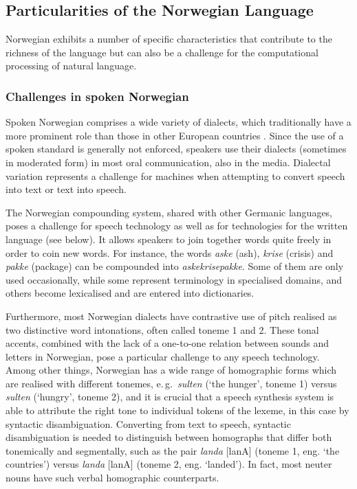 \begin{multicols}{2}
\subsection{Particularities of the Norwegian Language}

Norwegian exhibits a number of specific characteristics that contribute to the richness of the language but can also be a challenge for the computational processing of natural language. 

\subsubsection{Challenges in spoken Norwegian}
Spoken Norwegian comprises a wide variety of dialects, which traditionally have a more prominent role than those in other European countries \cite{stm35:2008}.
Since the use of a spoken standard is generally not enforced, speakers use their dialects (sometimes in moderated form) in most oral communication, also in the media.
Dialectal variation represents a challenge for machines when attempting to convert speech into text or text into speech.


The Norwegian compounding system, shared with other Germanic languages, poses a challenge for speech technology as well as for technologies for the written language (see below). 
It allows speakers to join together words quite freely in order to coin new words. 
For instance, the words \textit{aske} (ash), \textit{krise} (crisis) and \textit{pakke} (package) can be compounded into \textit{askekrisepakke}. 
Some of them are only used occasionally, while some represent terminology in specialised domains, and others become lexicalised and are entered into dictionaries. 

Furthermore, most Norwegian dialects have contrastive use of pitch realised as two distinctive word intonations, often called toneme 1 and 2. 
These tonal accents, combined with the lack of a one-to-one relation between sounds and letters in Norwegian, pose a particular challenge to any speech technology. 
Among other things, Norwegian has a wide range of homographic forms which are realised with different tonemes, e.\,g.~\textit{sulten} (‘the hunger’, toneme 1) versus \textit{sulten} (‘hungry’, toneme 2), and it is crucial that a speech synthesis system is able to attribute the right tone to individual tokens of the lexeme, in this case by syntactic disambiguation. 
Converting from text to speech, syntactic disambiguation is needed to distinguish between homographs that differ both tonemically and segmentally, such as the pair \textit{landa} {[}lanA{]} (toneme 1, eng. `the countries') versus \textit{landa} {[}lanA{]} (toneme 2, eng. `landed'). 
In fact, most neuter nouns have such verbal homographic counterparts.


\end{multicols}
